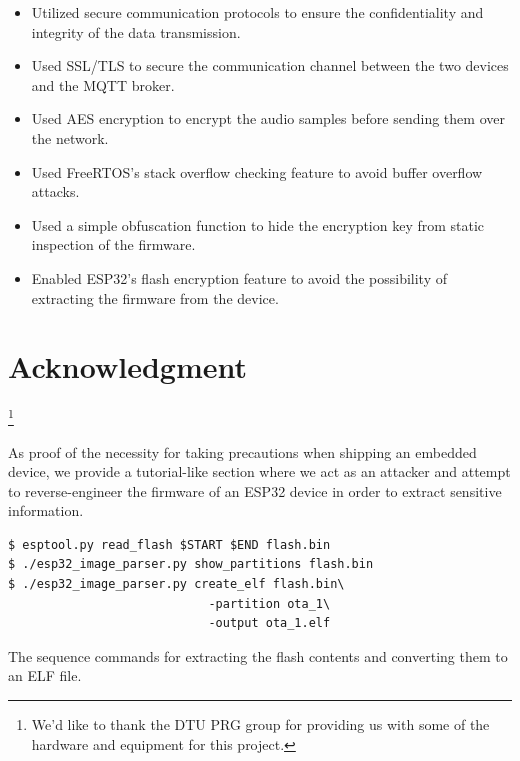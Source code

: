 \documentclass[conference]{IEEEtran}
\begin{document}
\begin{itemize}
    \item Utilized secure communication protocols to ensure the confidentiality and integrity of the data transmission.
    \item Used SSL/TLS to secure the communication channel between the two devices and the MQTT broker.
    \item Used AES encryption to encrypt the audio samples before sending them over the network.
    \item Used FreeRTOS's stack overflow checking feature to avoid buffer overflow attacks.
    \item Used a simple obfuscation function to hide the encryption key from static inspection of the firmware.
    \item Enabled ESP32's flash encryption feature to avoid the possibility of extracting the firmware from the device.
\end{itemize}

\section*{Acknowledgment}

\thanks{We'd like to thank the DTU PRG group for providing us with some of the hardware and equipment for this project.}




\appendices
{}

\label{appendix:reverse_engineering}

As proof of the necessity for taking precautions when shipping an embedded device, 
we provide a tutorial-like section where we act as an attacker and attempt to reverse-engineer the firmware of an ESP32
device in order to extract sensitive information.

\begin{listing}[h]
\begin{verbatim}
$ esptool.py read_flash $START $END flash.bin
$ ./esp32_image_parser.py show_partitions flash.bin
$ ./esp32_image_parser.py create_elf flash.bin\
                            -partition ota_1\
                            -output ota_1.elf
\end{verbatim}
\caption{The sequence commands for extracting the flash contents and converting them to an ELF file.}
\end{listing}
\end{document}
